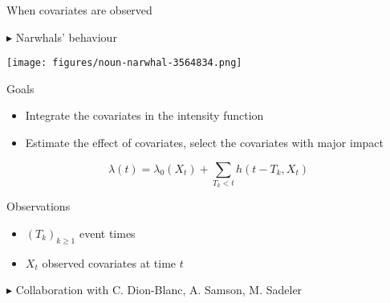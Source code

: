 \documentclass[french,english]{beamer}
\begin{document}
\begin{frame}{When covariates are observed}
  \vspace{-0.5cm}
\begin{minipage}{7cm}
    $\blacktriangleright$ Narwhals' behaviour
\end{minipage}
\begin{minipage}{3cm}
 \texttt{[image: figures/noun-narwhal-3564834.png]}   
\end{minipage}

       
        \begin{block}{Goals}
            \begin{itemize}
                \item Integrate the covariates in the intensity function
                \item Estimate the effect of covariates, select the covariates with major impact
            \end{itemize}
        \end{block}
        
    \vspace{-0.5cm}

             $$ \lambda(t)= \lambda_0(X_t) + \underset{T_k < t}{\sum} h(t-T_k,X_t)$$

             \vspace{-0.2cm}
    \begin{block}{Observations}
          \begin{itemize}
             \item  $(T_k)_{k \geq 1}$ event times
         \item  $X_t$ observed covariates at time $t$
         \end{itemize} 
     \end{block} 
 
$\blacktriangleright$  Collaboration with C. Dion-Blanc, A. Samson, M. Sadeler          
      

\end{frame}
\end{document}
